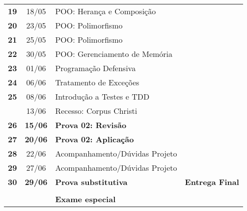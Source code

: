 \documentclass[11pt]{article}
\begin{document}
\begin{center}
\begin{tabular}{>{\bfseries}ccl>{\bfseries}c}
19 & 18/05 & POO: Herança e Composição & \\[0pt]
20 & 23/05 & POO: Polimorfismo & \\[0pt]
21 & 25/05 & POO: Polimorfismo & \\[0pt]
22 & 30/05 & POO: Gerenciamento de Memória & \\[0pt]
23 & 01/06 & Programação Defensiva & \\[0pt]
24 & 06/06 & Tratamento de Exceções & \\[0pt]
25 & 08/06 & Introdução a Testes e TDD & \\[0pt]
\rowcolor{green!40} & 13/06 & Recesso: Corpus Christi & \\[0pt]
\rowcolor{yellow!50} 26 & \textbf{15/06} & \textbf{Prova 02: Revisão} & \\[0pt]
\rowcolor{yellow!50} 27 & \textbf{20/06} & \textbf{Prova 02: Aplicação} & \\[0pt]
28 & 22/06 & Acompanhamento/Dúvidas Projeto & \\[0pt]
29 & 27/06 & Acompanhamento/Dúvidas Projeto & \\[0pt]
\rowcolor{yellow!50} 30 & \textbf{29/06} & \textbf{Prova substitutiva} & Entrega Final\\[0pt]
 &  &  & \\[0pt]
\rowcolor{yellow!50} &  & \textbf{Exame especial} & \\[0pt]
\bottomrule
\end{tabular}
\end{center}
\end{document}
